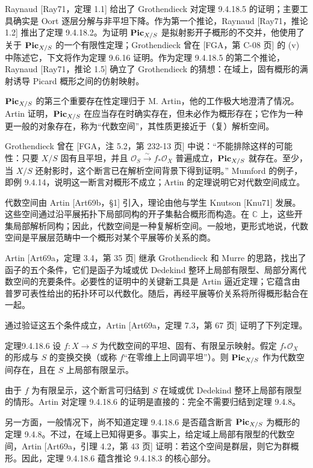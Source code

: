 Raynaud [Ray71，定理 1.1] 给出了 Grothendieck 对定理 9.4.18.5 的证明；主要工具确实是 Oort 逐层分解与非平坦下降。作为第一个推论，Raynaud [Ray71，推论 1.2] 推出了定理 9.4.18.2。为证明 $\mathbf{Pic}_{X/S}$ 是拟射影开子概形的不交并，他使用了关于 $\mathbf{Pic}_{X/S}$ 的一个有限性定理；Grothendieck 曾在 [FGA，第 C-08 页] 的 (v) 中陈述它，下文将作为定理 9.6.16 证明。作为定理 9.4.18.5 的第二个推论，Raynaud [Ray71，推论 1.5] 确立了 Grothendieck 的猜想：在域上，固有概形的满射诱导 Picard 概形之间的仿射映射。

$\mathbf{Pic}_{X/S}$ 的第三个重要存在性定理归于 M. Artin，他的工作极大地澄清了情况。Artin 证明，$\mathbf{Pic}_{X/S}$ 在应当存在时确实存在，但未必作为概形存在；它作为一种更一般的对象存在，称为“代数空间”，其性质更接近于（复）解析空间。

Grothendieck 曾在 [FGA，注 5.2，第 232-13 页] 中说：“不能排除这样的可能性：只要 $X/S$ 固有且平坦，并且 $\mathcal O_S\xrightarrow{\sim}f_*\mathcal O_X$ 普遍成立，$\mathbf{Pic}_{X/S}$ 就存在。至少，当 $X/S$ 还射影时，这个断言已在解析空间背景下得到证明。” Mumford 的例子，即例 9.4.14，说明这一断言对概形不成立；Artin 的定理说明它对代数空间成立。

代数空间由 Artin [Art69b，§1] 引入，理论由他与学生 Knutson [Knu71] 发展。这些空间通过沿平展拓扑下局部同构的开子集黏合概形而构造。在 $\mathbb C$ 上，这些开集局部解析同构；因此，代数空间是一种复解析空间。一般地，更形式地说，代数空间是平展层范畴中一个概形对某个平展等价关系的商。

Artin [Art69a，定理 3.4，第 35 页] 继承 Grothendieck 和 Murre 的思路，找出了函子的五个条件，它们是函子为域或优 Dedekind 整环上局部有限型、局部分离代数空间的充要条件。必要性的证明中的关键新工具是 Artin 逼近定理；它蕴含由普罗可表性给出的拓扑环可以代数化。随后，再经平展等价关系将所得概形黏合在一起。

通过验证这五个条件成立，Artin [Art69a，定理 7.3，第 67 页] 证明了下列定理。

\begin{origstatement}{定理}{9.4.18.6}\label{ch09s04:9.4.18.6}
设 $f:X\to S$ 为代数空间的平坦、固有、有限呈示映射。假定 $f_*\mathcal O_X$ 的形成与 $S$ 的变换交换（或称 $f$“在零维上上同调平坦”）。则 $\mathbf{Pic}_{X/S}$ 作为代数空间存在，且在 $S$ 上局部有限呈示。
\end{origstatement}
由于 $f$ 为有限呈示，这个断言可归结到 $S$ 在域或优 Dedekind 整环上局部有限型的情形。Artin 对定理 9.4.18.6 的证明是直接的：完全不需要归结到定理 9.4.8。

另一方面，一般情况下，尚不知道定理 9.4.18.6 是否蕴含断言 $\mathbf{Pic}_{X/S}$ 为概形的定理 9.4.8。不过，在域上已知得更多。事实上，给定域上局部有限型的代数空间，Artin [Art69a，引理 4.2，第 43 页] 证明：若这个空间是群层，则它为群概形。因此，定理 9.4.18.6 蕴含推论 9.4.18.3 的核心部分。

